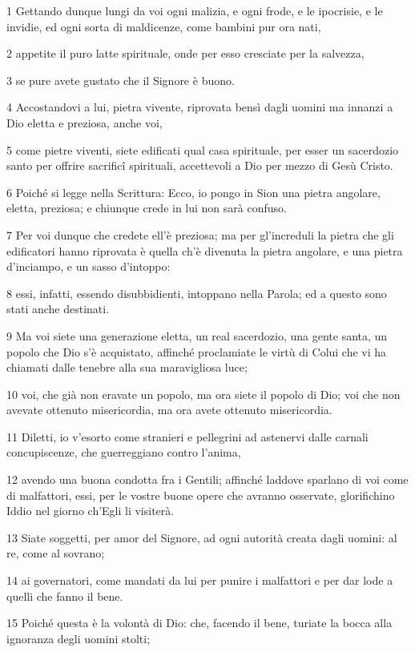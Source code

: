 \par 1 Gettando dunque lungi da voi ogni malizia, e ogni frode, e le ipocrisie, e le invidie, ed ogni sorta di maldicenze, come bambini pur ora nati,
\par 2 appetite il puro latte spirituale, onde per esso cresciate per la salvezza,
\par 3 se pure avete gustato che il Signore è buono.
\par 4 Accostandovi a lui, pietra vivente, riprovata bensì dagli uomini ma innanzi a Dio eletta e preziosa, anche voi,
\par 5 come pietre viventi, siete edificati qual casa spirituale, per esser un sacerdozio santo per offrire sacrificî spirituali, accettevoli a Dio per mezzo di Gesù Cristo.
\par 6 Poiché si legge nella Scrittura: Ecco, io pongo in Sion una pietra angolare, eletta, preziosa; e chiunque crede in lui non sarà confuso.
\par 7 Per voi dunque che credete ell'è preziosa; ma per gl'increduli la pietra che gli edificatori hanno riprovata è quella ch'è divenuta la pietra angolare, e una pietra d'inciampo, e un sasso d'intoppo:
\par 8 essi, infatti, essendo disubbidienti, intoppano nella Parola; ed a questo sono stati anche destinati.
\par 9 Ma voi siete una generazione eletta, un real sacerdozio, una gente santa, un popolo che Dio s'è acquistato, affinché proclamiate le virtù di Colui che vi ha chiamati dalle tenebre alla sua maravigliosa luce;
\par 10 voi, che già non eravate un popolo, ma ora siete il popolo di Dio; voi che non avevate ottenuto misericordia, ma ora avete ottenuto misericordia.
\par 11 Diletti, io v'esorto come stranieri e pellegrini ad astenervi dalle carnali concupiscenze, che guerreggiano contro l'anima,
\par 12 avendo una buona condotta fra i Gentili; affinché laddove sparlano di voi come di malfattori, essi, per le vostre buone opere che avranno osservate, glorifichino Iddio nel giorno ch'Egli li visiterà.
\par 13 Siate soggetti, per amor del Signore, ad ogni autorità creata dagli uomini: al re, come al sovrano;
\par 14 ai governatori, come mandati da lui per punire i malfattori e per dar lode a quelli che fanno il bene.
\par 15 Poiché questa è la volontà di Dio: che, facendo il bene, turiate la bocca alla ignoranza degli uomini stolti;
